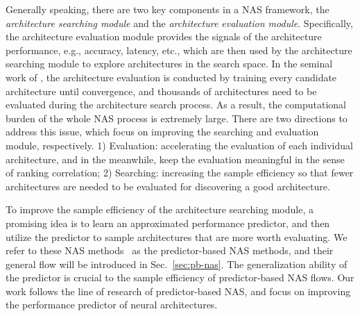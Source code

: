 \documentclass[runningheads]{llncs}
\begin{document}
Generally speaking, there are two key components in a NAS framework, the 
\textit{architecture searching module} and the \textit{architecture evaluation module}. Specifically, the architecture evaluation module provides the signals of the architecture performance, e.g., accuracy, latency, etc., which are then used by the architecture searching module to explore architectures in the search space.
In the seminal work of \cite{zoph2016neural}, the architecture evaluation is conducted by training every candidate architecture until convergence, 
and thousands of architectures need to be evaluated during the architecture search process. As a result, the computational burden of the whole NAS process is extremely large. There are two directions to address this issue, which focus on
improving the searching and evaluation module, respectively. 1) Evaluation: accelerating the evaluation of each individual architecture, and in the meanwhile, keep the evaluation meaningful in the sense of ranking correlation; 2) Searching: increasing the sample efficiency so that fewer architectures are needed to be evaluated for discovering a good architecture.



To improve the sample efficiency of the architecture searching module, a promising idea is to learn an approximated performance predictor, and then utilize the predictor to sample architectures that are more worth evaluating. We refer to these NAS methods~\cite{liu2018progressive,nao2018,wang2018alphax} as the predictor-based NAS methods, and their general flow will be introduced in Sec.~\ref{sec:pb-nas}. The generalization ability of the predictor is crucial to the sample efficiency of predictor-based NAS flows. Our work follows the line of research of predictor-based NAS, and focus on improving the performance predictor of neural architectures. 
\end{document}
